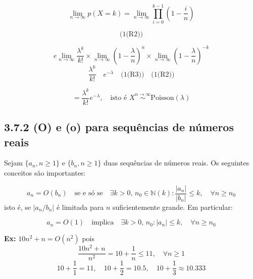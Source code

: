 \begin{equation}
\lim_{n \to \infty} p(X = k) = \lim_{n \to \infty} \prod_{i=0}^{k-1} \left( 1 - \frac{i}{n} \right)
\end{equation}

\[
\text{(1(R2))}
\]

\[
e \lim_{n \to \infty} \frac{\lambda^k}{k!} \times \lim_{n \to \infty} \left( 1 - \frac{\lambda}{n} \right)^n \times \lim_{n \to \infty} \left( 1 - \frac{\lambda}{n} \right)^{-k}
\]
\[
\frac{\lambda^k}{k!} \quad e^{-\lambda} \quad \text{(1(R3))} \quad \text{(1(R2))}
\]

\[
= \frac{\lambda^k}{k!} e^{-\lambda}, \quad \text{isto é } X \overset{n \to \infty}{\sim} \text{Poisson}(\lambda)
\]

\subsection*{3.7.2 (O) e (o) para sequências de números reais}

Sejam $\{a_n, n \geq 1\}$ e $\{b_n, n \geq 1\}$ duas sequências de números reais. Os seguintes conceitos são importantes:

\[
a_n = O(b_n) \quad \text{se e só se} \quad \exists k > 0, \, n_0 \in \mathbb{N}(k) : \frac{|a_n|}{|b_n|} \leq k, \quad \forall n \geq n_0
\]
isto é, se $|a_n / b_n|$ é limitada para $n$ suficientemente grande. Em particular:

\[
a_n = O(1) \quad \text{implica} \quad \exists k > 0, \, n_0 : |a_n| \leq k, \quad \forall n \geq n_0
\]

\textbf{Ex:} $10n^2 + n = O(n^2)$ pois
\[
\frac{10n^2 + n}{n^2} = 10 + \frac{1}{n} \leq 11, \quad \forall n \geq 1
\]
\[
10 + \frac{1}{1} = 11, \quad 10 + \frac{1}{2} = 10.5, \quad 10 + \frac{1}{3} \approx 10.333
\]